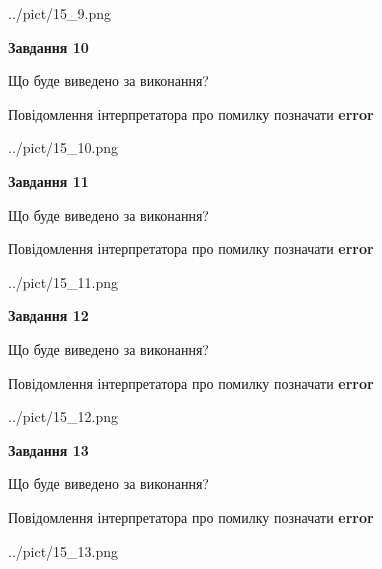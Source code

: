 \documentclass[11pt, ukrainian]{article}
\begin{document}
{\begin {large}
\begin{center}
	{../pict/15_9.png}
\end{center}
\newpage

{\begin {center}\textbf{Завдання 10}\end {center}}\par
Що буде виведено за виконання? \par
Повідомлення інтерпретатора про помилку позначати \textbf{error}

\begin{center}
	{../pict/15_10.png}
\end{center}
\newpage

{\begin {center}\textbf{Завдання 11}\end {center}}\par
Що буде виведено за виконання? \par
Повідомлення інтерпретатора про помилку позначати \textbf{error}

\begin{center}
	{../pict/15_11.png}
\end{center}
\newpage

{\begin {center}\textbf{Завдання 12}\end {center}}\par
Що буде виведено за виконання? \par
Повідомлення інтерпретатора про помилку позначати \textbf{error}

\begin{center}
	{../pict/15_12.png}
\end{center}
\newpage

{\begin {center}\textbf{Завдання 13}\end {center}}\par
Що буде виведено за виконання? \par
Повідомлення інтерпретатора про помилку позначати \textbf{error}

\begin{center}
	{../pict/15_13.png}
\end{center}
\newpage


\end{large}}
\end{document}
